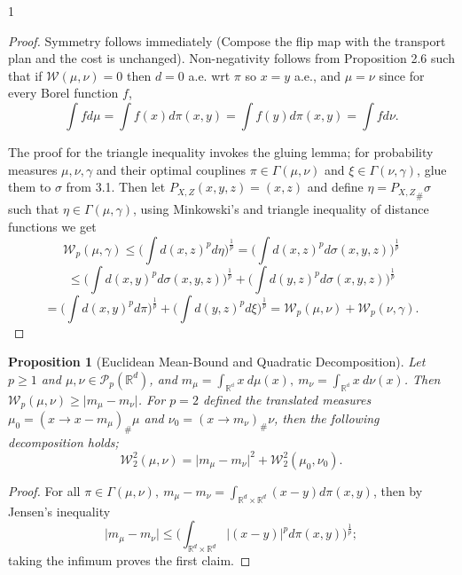 \documentclass[12pt]{article}
\newtheorem{proposition}[theorem]{Proposition}
\theoremstyle{definition}
\theoremstyle{plain}
\begin{document}
\begin{spacing}{1}
{\begin{proof}
    Symmetry follows immediately (Compose the flip map with the transport plan and the cost is unchanged). Non-negativity follows from Proposition 2.6 such that if $\mathcal{W}(\mu, \nu) = 0$ then $d = 0$ a.e. wrt $\pi$ so $x = y$ a.e., and $\mu = \nu$ since for every Borel function $f$,
    \[
    \displaystyle \int f d\mu = \int f(x) d\pi(x, y) = \int f(y) d\pi(x, y) = \int f d\nu.
    \]
    
    The proof for the triangle inequality invokes the gluing lemma; for probability measures $\mu, \nu, \gamma$ and their optimal couplines $\pi \in \Gamma(\mu, \nu)$ and $\xi \in \Gamma(\nu, \gamma)$, glue them to $\sigma$ from 3.1. Then let $P_{X, Z}(x, y, z) = (x, z)$ and define $\eta = {P_{X, Z}}_\# \sigma$ such that $\eta \in \Gamma(\mu, \gamma)$, using Minkowski's and triangle inequality of distance functions we get
    \[
    \mathcal{W}_p(\mu, \gamma) \leq \displaystyle \bigg (\int d(x, z)^p d\eta \bigg)^\frac{1}{p} = \bigg (\int d(x, z)^p d\sigma(x, y, z) \bigg)^\frac{1}{p}
    \]
    \[
     \leq \bigg (\displaystyle \int d(x, y)^p d\sigma(x, y, z)\bigg )^\frac{1}{p} + \bigg (\displaystyle \int d(y, z)^p d\sigma(x, y, z) \bigg )^\frac{1}{p}
    \]
    \[
     = \displaystyle \bigg (\int d(x, y)^p d\pi \bigg)^\frac{1}{p} + \displaystyle \bigg (\int d(y, z)^p d\xi \bigg)^\frac{1}{p} = \mathcal{W}_p(\mu, \nu) + \mathcal{W}_p(\nu, \gamma).
    \]
\end{proof}

\begin{proposition}[Euclidean Mean-Bound and Quadratic Decomposition]
    Let $p \geq 1$ and $\mu, \nu \in \mathcal{P}_p(\mathbb{R}^d)$, and $m_\mu = \displaystyle \int_{\mathbb{R^d}} x \ d\mu(x), \ m_\nu = \int_{\mathbb{R^d}} x \ d\nu(x)$. Then $\mathcal{W}_p(\mu, \nu) \geq \lvert m_\mu - m_\nu \rvert$. For $p = 2$ defined the translated measures $\mu_0 = (x \rightarrow x - m_\mu)_\# \mu$ and $\nu_0 = (x \rightarrow m_\nu)_\# \nu$, then the following decomposition holds;
    \[
    \mathcal{W}_2^2(\mu, \nu) = \lvert m_\mu - m_\nu \rvert^2 + \mathcal{W}_2^2(\mu_0, \nu_0).
    \]
\end{proposition}

\begin{proof}
    For all $\pi \in \Gamma(\mu, \nu), \ m_\mu - m_\nu = \displaystyle \int_{\mathbb{R}^d \times \mathbb{R}^d} (x - y) d\pi(x, y)$, then by Jensen's inequality
    \[ \lvert m_\mu - m_\nu \rvert \leq \displaystyle \bigg (\int_{\mathbb{R}^d \times \mathbb{R}^d} \lvert (x - y) \rvert^p d\pi(x, y) \bigg )^\frac{1}{p};
    \]
    taking the infimum proves the first claim.


\end{proof}}
\end{spacing}
\end{document}

